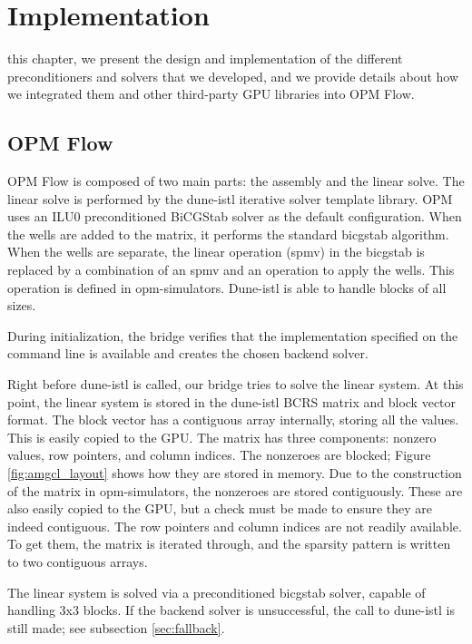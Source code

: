 \section{Implementation}
\label{sec:implementation}

 this chapter, we present the design and implementation of the different preconditioners and solvers that we developed, and we provide details about how we integrated them and other third-party GPU libraries into OPM Flow. 

\subsection{OPM Flow}
OPM Flow is composed of two main parts: the assembly and the linear solve. The linear solve is performed by the dune-istl\cite{dune-istl} iterative solver template library. 
OPM uses an ILU0 preconditioned BiCGStab solver as the default configuration. 
When the wells are added to the matrix, it performs the standard bicgstab algorithm.
When the wells are separate, the linear operation (spmv) in the bicgstab is replaced by a combination of an spmv and an operation to apply the wells.
This operation is defined in opm-simulators.
Dune-istl is able to handle blocks of all sizes.

During initialization, the bridge verifies that the implementation specified on the command line is available and creates the chosen backend solver.

Right before dune-istl is called, our bridge tries to solve the linear system.
At this point, the linear system is stored in the dune-istl BCRS matrix and block vector format.
The block vector has a contiguous array internally, storing all the values.
This is easily copied to the GPU.
The matrix has three components: nonzero values, row pointers, and column indices.
The nonzeroes are blocked; Figure \ref{fig:amgcl_layout} shows how they are stored in memory.
Due to the construction of the matrix in opm-simulators, the nonzeroes are stored contiguously.
These are also easily copied to the GPU, but a check must be made to ensure they are indeed contiguous.
The row pointers and column indices are not readily available.
To get them, the matrix is iterated through, and the sparsity pattern is written to two contiguous arrays.

The linear system is solved via a preconditioned bicgstab solver, capable of handling 3x3 blocks.
If the backend solver is unsuccessful, the call to dune-istl is still made; see subsection \ref{sec:fallback}.

